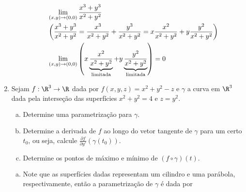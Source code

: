 \documentclass{book}
\begin{document}
\begin{enumerate}
\begin{enumerate}[(a)]
\begin{sol}
\[
\begin{gathered}
  \mathop {\lim }\limits_{\left( {x,y} \right) \to \left( {0,0} \right)} \frac{{x^3  + y^3 }}
{{x^2  + y^2 }} \hfill \\
  \left( {\frac{{x^3  + y^3 }}
{{x^2  + y^2 }} = \frac{{x^3 }}
{{x^2  + y^2 }} + \frac{{y^3 }}
{{x^2  + y^2 }} = x\frac{{x^2 }}
{{x^2  + y^2 }} + y\frac{{y^2 }}
{{x^2  + y^2 }}} \right) \hfill \\
  \mathop {\lim }\limits_{\left( {x,y} \right) \to \left( {0,0} \right)} \left( {x\underbrace {\frac{{x^2 }}
{{x^2  + y^2 }}}_{{\text{limitada}}} + y\underbrace {\frac{{y^2 }}
{{x^2  + y^2 }}}_{{\text{limitada}}}} \right) = 0 \hfill \\
\end{gathered}
\]

\end{sol}

\end{enumerate}

\item Sejam $f:\R^3 \to \R$ dada por $f(x,y,z)=x^2+y^2-z$ e $\gamma$ a curva em $\R^3$ dada pela interse\c{c}\~ao das superf\'icies $x^2+y^2=4$ e $z=y^2$.

\begin{enumerate}[(a)]
	\item Determine uma parametriza\c{c}\~ao para $\gamma$.

	\item Determine a derivada de $f$ ao longo do vetor tangente de $\gamma$ para um certo $t_0$, ou seja, calcule $\displaystyle \frac{{\partial f}}{{\partial y'}}\left( {\gamma \left( {t_0 } \right)} \right)$.

	\item Determine os pontos de m\'aximo e m\'inimo de $\left( {f \circ \gamma } \right)\left( t \right)$.

\end{enumerate}

\begin{sol}
\begin{enumerate}[(a)]
  \item Note que as superf\'icies dadas representam um cilindro e uma par\'abola, respectivamente, ent\~ao a parametriza\c{c}\~ao de $\gamma$ \'e dada por


\end{enumerate}
\end{sol}
\end{enumerate}
\end{document}

